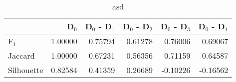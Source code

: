 \begin{table}
\centering
\caption{asd}
\label{asd}
\begin{tabular}{lrrrrr}
\toprule
{} &   D$_0$ &  D$_0$ - D$_1$ &  D$_0$ - D$_2$ &  D$_0$ - D$_3$ &  D$_0$ - D$_4$ \\
\midrule
F$_1$      & 1.00000 &        0.75794 &        0.61278 &        0.76006 &        0.69067 \\
Jaccard    & 1.00000 &        0.67231 &        0.56356 &        0.71159 &        0.64587 \\
Silhouette & 0.82584 &        0.41359 &        0.26689 &       -0.10226 &       -0.16562 \\
\bottomrule
\end{tabular}
\end{table}
